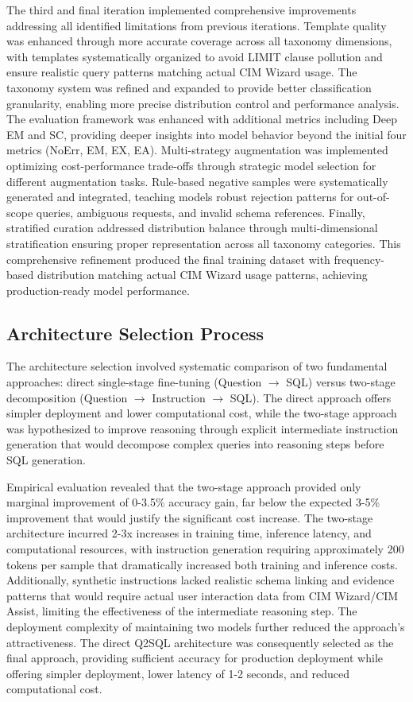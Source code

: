 The third and final iteration implemented comprehensive improvements addressing all identified limitations from previous iterations. Template quality was enhanced through more accurate coverage across all taxonomy dimensions, with templates systematically organized to avoid LIMIT clause pollution and ensure realistic query patterns matching actual CIM Wizard usage. The taxonomy system was refined and expanded to provide better classification granularity, enabling more precise distribution control and performance analysis. The evaluation framework was enhanced with additional metrics including Deep EM and SC, providing deeper insights into model behavior beyond the initial four metrics (NoErr, EM, EX, EA). Multi-strategy augmentation was implemented optimizing cost-performance trade-offs through strategic model selection for different augmentation tasks. Rule-based negative samples were systematically generated and integrated, teaching models robust rejection patterns for out-of-scope queries, ambiguous requests, and invalid schema references. Finally, stratified curation addressed distribution balance through multi-dimensional stratification ensuring proper representation across all taxonomy categories. This comprehensive refinement produced the final training dataset with frequency-based distribution matching actual CIM Wizard usage patterns, achieving production-ready model performance.

\subsection{Architecture Selection Process}

The architecture selection involved systematic comparison of two fundamental approaches: direct single-stage fine-tuning (Question $\rightarrow$ SQL) versus two-stage decomposition (Question $\rightarrow$ Instruction $\rightarrow$ SQL). The direct approach offers simpler deployment and lower computational cost, while the two-stage approach was hypothesized to improve reasoning through explicit intermediate instruction generation that would decompose complex queries into reasoning steps before SQL generation.

Empirical evaluation revealed that the two-stage approach provided only marginal improvement of 0-3.5\% accuracy gain, far below the expected 3-5\% improvement that would justify the significant cost increase. The two-stage architecture incurred 2-3x increases in training time, inference latency, and computational resources, with instruction generation requiring approximately 200 tokens per sample that dramatically increased both training and inference costs. Additionally, synthetic instructions lacked realistic schema linking and evidence patterns that would require actual user interaction data from CIM Wizard/CIM Assist, limiting the effectiveness of the intermediate reasoning step. The deployment complexity of maintaining two models further reduced the approach's attractiveness. The direct Q2SQL architecture was consequently selected as the final approach, providing sufficient accuracy for production deployment while offering simpler deployment, lower latency of 1-2 seconds, and reduced computational cost.

